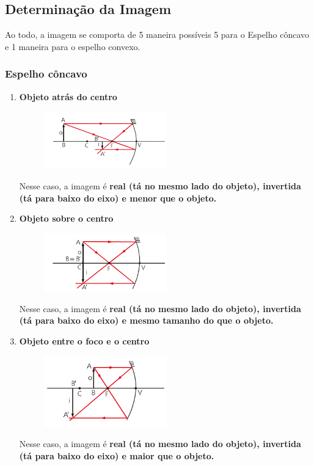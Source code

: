 \documentclass[12pt]{extarticle}
\newcommand{\<}{\langle}
\renewcommand{\>}{\rangle}
\theoremstyle{definition}
\begin{document}
\subsection{Determinação da Imagem}
Ao todo, a imagem se comporta de 5 maneira possíveis 5 para o Espelho côncavo e 1 maneira para o espelho convexo.

\subsubsection{Espelho côncavo}
\begin{enumerate}
    \item \textbf{Objeto atrás do centro}
    \begin{figure}[H]
        \centering
        \includegraphics[width=0.5\textwidth]{concavo_caso_1.png}
        \label{fig:concavo_caso_1}
    \end{figure}
    Nesse caso, a imagem é \textbf{real (tá no mesmo lado do objeto), invertida (tá para baixo do eixo) e menor que o objeto.}
    
    \item \textbf{Objeto sobre o centro}
    \begin{figure}[H]
        \centering
        \includegraphics[width=0.5\textwidth]{concavo_caso_2.png}
        \label{fig:concavo_caso_2}
    \end{figure}
    Nesse caso, a imagem é \textbf{real (tá no mesmo lado do objeto), invertida (tá para baixo do eixo) e mesmo tamanho do que o objeto.}
    
    \item \textbf{Objeto entre o foco e o centro}
    \begin{figure}[H]
        \centering
        \includegraphics[width=0.5\textwidth]{concavo_caso_3.png}
        \label{fig:concavo_caso_3}
    \end{figure}
    Nesse caso, a imagem é \textbf{real (tá no mesmo lado do objeto), invertida (tá para baixo do eixo) e maior que o objeto.}
    

\end{enumerate}
\end{document}
